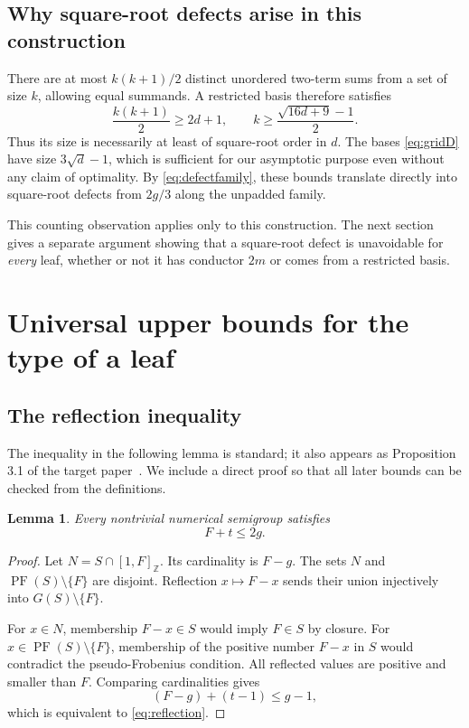 \documentclass[11pt,letterpaper]{article}
\numberwithin{equation}{section}
\newtheorem{lemma}[theorem]{Lemma}
\theoremstyle{definition}
\theoremstyle{remark}
\newcommand{\Z}{\mathbb Z}
\newcommand{\ints}[2]{[#1,#2]_{\Z}}
\DeclareMathOperator{\PF}{PF}
\begin{document}
\subsection{Why square-root defects arise in this construction}

There are at most $k(k+1)/2$ distinct unordered two-term sums from a set of
size $k$, allowing equal summands. A restricted basis therefore satisfies
\[
 \frac{k(k+1)}2\ge2d+1,
 \qquad
 k\ge\frac{\sqrt{16d+9}-1}{2}.
\]
Thus its size is necessarily at least of square-root order in $d$.
The bases \eqref{eq:gridD} have size $3\sqrt d-1$, which is sufficient for
our asymptotic purpose even without any claim of optimality. By
\eqref{eq:defectfamily}, these bounds translate directly into square-root
defects from $2g/3$ along the unpadded family.

This counting observation applies only to this construction. The next
section gives a separate argument showing that a square-root defect is
unavoidable for \emph{every} leaf, whether or not it has conductor $2m$ or
comes from a restricted basis.

\section{Universal upper bounds for the type of a leaf}\label{sec:upper}

\subsection{The reflection inequality}

The inequality in the following lemma is standard; it also appears as
Proposition 3.1 of the target paper~\cite{CRS}. We include a direct proof so
that all later bounds can be checked from the definitions.

\begin{lemma}\label{lem:reflection}
Every nontrivial numerical semigroup satisfies
\begin{equation}\label{eq:reflection}
 F+t\le2g.
\end{equation}
\end{lemma}

\begin{proof}
Let $N=S\cap\ints{1}{F}$. Its cardinality is $F-g$. The sets $N$ and
$\PF(S)\setminus\{F\}$ are disjoint. Reflection $x\mapsto F-x$ sends
their union injectively into $G(S)\setminus\{F\}$.

For $x\in N$, membership $F-x\in S$ would imply $F\in S$ by closure.
For $x\in\PF(S)\setminus\{F\}$, membership of the positive number
$F-x$ in $S$ would contradict the pseudo-Frobenius condition. All reflected
values are positive and smaller than $F$. Comparing cardinalities gives
\[
 (F-g)+(t-1)\le g-1,
\]
which is equivalent to \eqref{eq:reflection}.
\end{proof}
\end{document}
